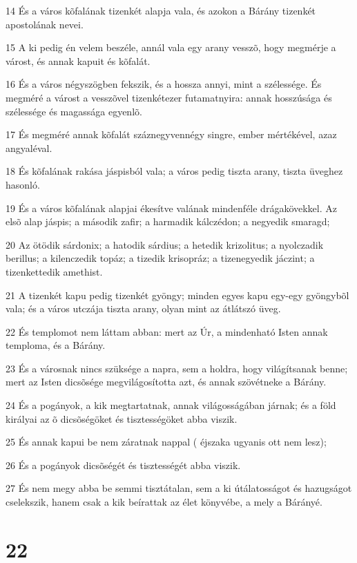\par 14 És a város kõfalának tizenkét alapja vala, és azokon a Bárány tizenkét apostolának  nevei.
\par 15 A ki pedig én velem beszéle, annál vala egy arany vesszõ, hogy megmérje a várost, és annak kapuit és kõfalát.
\par 16 És a város négyszögben fekszik, és a hossza annyi, mint a szélessége. És megméré a várost a vesszõvel tizenkétezer futamatnyira: annak hosszúsága és szélessége és magassága egyenlõ.
\par 17 És megméré annak kõfalát száznegyvennégy singre, ember mértékével, azaz angyaléval.
\par 18 És kõfalának rakása jáspisból vala; a város pedig tiszta arany, tiszta üveghez hasonló.
\par 19 És a város kõfalának alapjai ékesítve valának mindenféle drágakövekkel. Az elsõ alap jáspis; a második zafir; a harmadik kálczédon; a negyedik smaragd;
\par 20 Az ötödik sárdonix; a hatodik sárdius; a hetedik krizolitus; a nyolczadik berillus; a kilenczedik topáz; a tizedik krisopráz; a tizenegyedik jáczint; a tizenkettedik amethist.
\par 21 A tizenkét kapu pedig tizenkét gyöngy; minden egyes kapu egy-egy gyöngybõl vala; és a város utczája tiszta arany, olyan mint az átlátszó üveg.
\par 22 És templomot nem láttam abban: mert az Úr, a mindenható Isten annak temploma, és a Bárány.
\par 23 És a városnak nincs szüksége a napra, sem a holdra, hogy világítsanak benne; mert az Isten dicsõsége megvilágosította azt, és annak szövétneke a Bárány.
\par 24 És a pogányok, a kik megtartatnak, annak világosságában járnak; és a föld királyai az õ dicsõségöket és tisztességöket abba viszik.
\par 25 És annak kapui be nem záratnak nappal ( éjszaka ugyanis ott nem lesz);
\par 26 És a pogányok dicsõségét és tisztességét abba viszik.
\par 27 És nem megy abba be semmi tisztátalan, sem a ki útálatosságot és hazugságot cselekszik, hanem csak a kik beírattak az  élet könyvébe, a mely a Bárányé.

\chapter{22}

